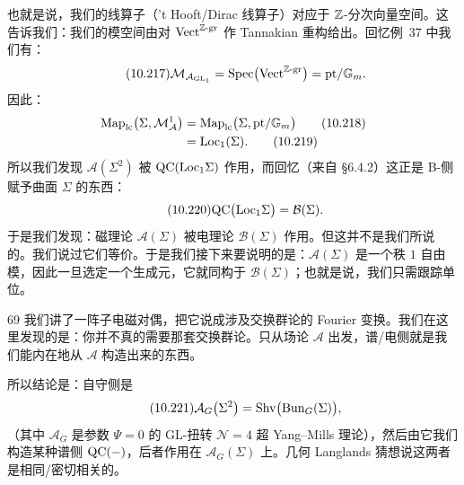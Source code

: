 也就是说，我们的线算子（'t Hooft/Dirac 线算子）对应于 $\mathbb{Z}$-分次向量空间。这告诉我们：我们的模空间由对 $\mathrm{Vect}^{\mathbb{Z}\text{-gr}}$ 作 Tannakian 重构给出。回忆例~37 中我们有：
\begin{equation}\tag{10.217}
\mathcal{M}_{\mathcal{A}_{\mathrm{GL}_1}}=\mathrm{Spec}\big(\mathrm{Vect}^{\mathbb{Z}\text{-gr}}\big)=\mathrm{pt}/\mathbb{G}_m.
\end{equation}
因此：
\begin{align}
\mathrm{Map}_{\mathrm{lc}}\big(\Sigma,\mathcal{M}_{\mathcal{A}}^{1}\big)&=\mathrm{Map}_{\mathrm{lc}}\big(\Sigma,\mathrm{pt}/\mathbb{G}_m\big)\tag{10.218}\\
&=\mathrm{Loc}_1(\Sigma).\tag{10.219}
\end{align}
所以我们发现 $\mathcal{A}(\Sigma^2)$ 被 $\mathrm{QC}(\mathrm{Loc}_1\Sigma)$ 作用，而回忆（来自 \S6.4.2）这正是 B-侧赋予曲面 $\Sigma$ 的东西：
\begin{equation}\tag{10.220}
\mathrm{QC}\big(\mathrm{Loc}_1\Sigma\big)=\mathcal{B}(\Sigma).
\end{equation}
于是我们发现：磁理论 $\mathcal{A}(\Sigma)$ 被电理论 $\mathcal{B}(\Sigma)$ 作用。但这并不是我们所说的。我们说过它们等价。于是我们接下来要说明的是：$\mathcal{A}(\Sigma)$ 是一个秩 $1$ 自由模，因此一旦选定一个生成元，它就同构于 $\mathcal{B}(\Sigma)$；也就是说，我们只需跟踪单位。

\begin{srcrem}{69}
我们讲了一阵子电磁对偶，把它说成涉及交换群论的 Fourier 变换。我们在这里发现的是：你并不真的需要那套交换群论。只从场论 $\mathcal{A}$ 出发，谱/电侧就是我们能内在地从 $\mathcal{A}$ 构造出来的东西。
\end{srcrem}

所以结论是：自守侧是
\begin{equation}\tag{10.221}
\mathcal{A}_G\big(\Sigma^2\big)=\mathrm{Shv}\big(\mathrm{Bun}_G(\Sigma)\big),
\end{equation}
（其中 $\mathcal{A}_G$ 是参数 $\Psi=0$ 的 GL-扭转 $\mathcal{N}=4$ 超 Yang--Mills 理论），然后由它我们构造某种谱侧 $\mathrm{QC}(-)$，后者作用在 $\mathcal{A}_G(\Sigma)$ 上。几何 Langlands 猜想说这两者是相同/密切相关的。


